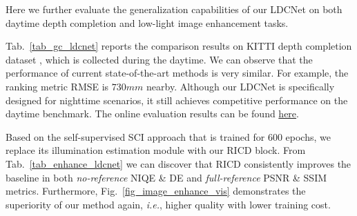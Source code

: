\documentclass{article}
\begin{document}
Here we further evaluate the generalization capabilities of our LDCNet on both daytime depth completion \cite{Uhrig2017THREEDV} and low-light image enhancement \cite{zhang2021beyond} tasks. 

Tab.~\ref{tab_gc_ldcnet} reports the comparison results on KITTI depth completion dataset \cite{Uhrig2017THREEDV}, which is collected during the daytime. We can observe that the performance of current state-of-the-art methods \cite{Qiu_2019_CVPR,tang2020learning,yan2022rignet,lin2022dynamic,Zhang2023CompletionFormer} is very similar. For example, the ranking metric RMSE is $730mm$ nearby. Although our LDCNet is specifically designed for nighttime scenarios, it still achieves competitive performance on the daytime benchmark. The online evaluation results can be found \href{https://www.cvlibs.net/datasets/kitti/eval_depth_detail.php?benchmark=depth_completion&result=154c29fcae1dad35f5482274f3ae6a2b17c99bc7}{here}. 

\begin{table}
\vspace{-18pt}
\centering
\caption{Comparison on \href{https://github.com/vis-opt-group/SCI/tree/main/data/difficult}{difficult test split} of SCI.}
\vspace{1pt}
\label{tab_enhance_ldcnet}
\vspace{-11pt}
\end{table}

Based on the self-supervised SCI \cite{ma2022toward} approach that is trained for $600$ epochs, we replace its illumination estimation module with our RICD block. From Tab.~\ref{tab_enhance_ldcnet} we can discover that RICD consistently improves the baseline in both \emph{no-reference} NIQE \cite{wang2013naturalness} \& DE \cite{shannon1948mathematical} and \emph{full-reference} PSNR \& SSIM metrics. Furthermore, Fig.~\ref{fig_image_enhance_vis} demonstrates the superiority of our method again, \emph{i.e.}, higher quality with lower training cost. 
\end{document}
